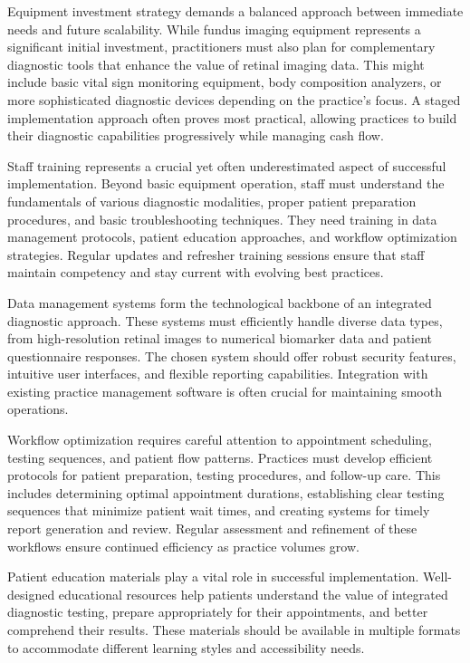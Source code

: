 \documentclass[
  Letterpaper,
]{scrbook}
\begin{document}
Equipment investment strategy demands a balanced approach between
immediate needs and future scalability. While fundus imaging equipment
represents a significant initial investment, practitioners must also
plan for complementary diagnostic tools that enhance the value of
retinal imaging data. This might include basic vital sign monitoring
equipment, body composition analyzers, or more sophisticated diagnostic
devices depending on the practice's focus. A staged implementation
approach often proves most practical, allowing practices to build their
diagnostic capabilities progressively while managing cash flow.

Staff training represents a crucial yet often underestimated aspect of
successful implementation. Beyond basic equipment operation, staff must
understand the fundamentals of various diagnostic modalities, proper
patient preparation procedures, and basic troubleshooting techniques.
They need training in data management protocols, patient education
approaches, and workflow optimization strategies. Regular updates and
refresher training sessions ensure that staff maintain competency and
stay current with evolving best practices.

Data management systems form the technological backbone of an integrated
diagnostic approach. These systems must efficiently handle diverse data
types, from high-resolution retinal images to numerical biomarker data
and patient questionnaire responses. The chosen system should offer
robust security features, intuitive user interfaces, and flexible
reporting capabilities. Integration with existing practice management
software is often crucial for maintaining smooth operations.

Workflow optimization requires careful attention to appointment
scheduling, testing sequences, and patient flow patterns. Practices must
develop efficient protocols for patient preparation, testing procedures,
and follow-up care. This includes determining optimal appointment
durations, establishing clear testing sequences that minimize patient
wait times, and creating systems for timely report generation and
review. Regular assessment and refinement of these workflows ensure
continued efficiency as practice volumes grow.

Patient education materials play a vital role in successful
implementation. Well-designed educational resources help patients
understand the value of integrated diagnostic testing, prepare
appropriately for their appointments, and better comprehend their
results. These materials should be available in multiple formats to
accommodate different learning styles and accessibility needs.
\end{document}
